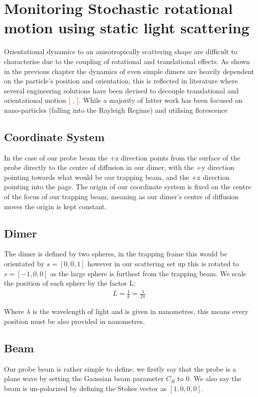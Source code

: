 \documentclass[a4paper,oneside,11pt]{book}
\begin{document}
\section{Monitoring Stochastic rotational motion using static light scattering}
Orientational dynamics to an anisotropically scattering shape are difficult to characterise due to the coupling of rotational and translational effects. As shown in the previous chapter the dynamics of even simple dimers are heavily dependent on the particle's position and orientation, this is reflected in literature where several engineering solutions have been devised to decouple translational and orientational motion \textcolor{red}{[ , ]}. While a majority of latter work has been focused on nano-particles (falling into the Rayleigh Regime) and utilising florescence 

\subsection{Coordinate System}
In the case of our probe beam the +z direction points from the surface of the probe directly to the centre of diffusion in our dimer, with the +y direction pointing towards what would be our trapping beam, and the +x direction pointing into the page. The origin of our coordinate system is fixed on the centre of the focus of our trapping beam, meaning as our dimer's centre of diffusion moves the origin is kept constant.
\subsection{Dimer}
The dimer is defined by two spheres, in the trapping frame this would be orientated by $s=[0,0,1]$ however in our scattering set up this is rotated to $s=[-1,0,0]$ as the large sphere is furthest from the trapping beam. We scale the position of each sphere by the factor L:
\begin{align}
	L = \frac{1}{k} = \frac{\lambda}{2\pi}
\end{align}

Where $\lambda$ is the wavelength of light and is given in nanometres, this means every position must be also provided in nanometres.
\subsection{Beam}
Our probe beam is rather simple to define, we firstly say that the probe is a plane wave by setting the Gaussian beam parameter $C_B$ to 0. We also say the beam is un-polarized by defining the Stokes vector as $[1,0,0,0]$. 
\end{document}
